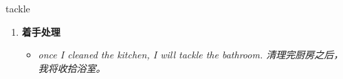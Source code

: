 
\begin{frame}
{\huge tackle}
\begin{center}
\begin{enumerate}\Large
  \item \textbf{着手处理}
  \begin{itemize}
    \item \em{\Large{once I cleaned the kitchen, I will tackle the bathroom. 清理完厨房之后，我将收拾浴室。}}
  \end{itemize}
\end{enumerate}
\end{center}
\end{frame}

